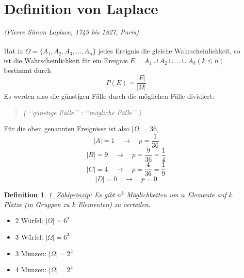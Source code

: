 \documentclass{report}
\newtheorem{mydef}{Definition}
\begin{document}
\section{Definition von Laplace}
\textit{(Pierre Simon Laplace, 1749 bis 1827, Paris)}\\\\
Hat in $\Omega = \{ A_1, A_2, A_3, ..., A_n \}$ jedes Ereignis die gleiche Wahrscheinlichkeit, so ist die Wahrscheinlichkeit für ein Ereignis $E = A_1 \cup A_2 \cup ... \cup A_k (k \leq n)$ bestimmt durch
\begin{equation}
P(E) = \frac{|E|}{|\Omega|}
\end{equation}
Es werden also die günstigen Fälle durch die möglichen Fälle dividiert:
\begin{quote}
\textit{( \lq\lq{}günstige Fälle\rq\rq{} \quad : \quad \lq\lq{}mögliche Fälle\rq\rq{} )}
\end{quote}
Für die oben genannten Ereignisse ist also $|\Omega| = 36$,
\begin{equation}
|A| = 1 \quad \longrightarrow \quad p = \frac{1}{36}
\end{equation}
\begin{equation}
|B| = 9 \quad \longrightarrow \quad p = \frac{9}{36} = \frac{1}{4}
\end{equation}
\begin{equation}
|C| = 4 \quad \longrightarrow \quad p = \frac{4}{36} = \frac{1}{9}
\end{equation}
\begin{equation}
|D| = 0 \quad \longrightarrow \quad p = 0
\end{equation}
\begin{mydef}
\underline{1. Zählprinzip}: Es gibt $n^k$ Möglichkeiten um $n$ Elemente auf $k$ Plätze (in Gruppen zu $k$ Elementen) zu verteilen.
\end{mydef}
\begin{itemize}
\item 2 Würfel: $|\Omega| = 6^2$
\item 3 Würfel: $|\Omega| = 6^3$
\item 3 Münzen: $|\Omega| = 2^3$
\item 4 Münzen: $|\Omega| = 2^4$
\end{itemize}
\end{document}
